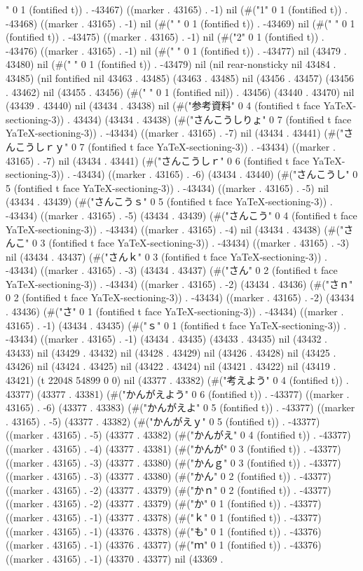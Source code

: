 " 0 1 (fontified t)) . -43467) ((marker . 43165) . -1) nil (#("1" 0 1 (fontified t)) . -43468) ((marker . 43165) . -1) nil (#("
" 0 1 (fontified t)) . -43469) nil (#("
" 0 1 (fontified t)) . -43475) ((marker . 43165) . -1) nil (#("2" 0 1 (fontified t)) . -43476) ((marker . 43165) . -1) nil (#("
" 0 1 (fontified t)) . -43477) nil (43479 . 43480) nil (#("
" 0 1 (fontified t)) . -43479) nil (nil rear-nonsticky nil 43484 . 43485) (nil fontified nil 43463 . 43485) (43463 . 43485) nil (43456 . 43457) (43456 . 43462) nil (43455 . 43456) (#(" " 0 1 (fontified nil)) . 43456) (43440 . 43470) nil (43439 . 43440) nil (43434 . 43438) nil (#("参考資料" 0 4 (fontified t face YaTeX-sectioning-3)) . 43434) (43434 . 43438) (#("さんこうしりょ" 0 7 (fontified t face YaTeX-sectioning-3)) . -43434) ((marker . 43165) . -7) nil (43434 . 43441) (#("さんこうしｒｙ" 0 7 (fontified t face YaTeX-sectioning-3)) . -43434) ((marker . 43165) . -7) nil (43434 . 43441) (#("さんこうしｒ" 0 6 (fontified t face YaTeX-sectioning-3)) . -43434) ((marker . 43165) . -6) (43434 . 43440) (#("さんこうし" 0 5 (fontified t face YaTeX-sectioning-3)) . -43434) ((marker . 43165) . -5) nil (43434 . 43439) (#("さんこうｓ" 0 5 (fontified t face YaTeX-sectioning-3)) . -43434) ((marker . 43165) . -5) (43434 . 43439) (#("さんこう" 0 4 (fontified t face YaTeX-sectioning-3)) . -43434) ((marker . 43165) . -4) nil (43434 . 43438) (#("さんこ" 0 3 (fontified t face YaTeX-sectioning-3)) . -43434) ((marker . 43165) . -3) nil (43434 . 43437) (#("さんｋ" 0 3 (fontified t face YaTeX-sectioning-3)) . -43434) ((marker . 43165) . -3) (43434 . 43437) (#("さん" 0 2 (fontified t face YaTeX-sectioning-3)) . -43434) ((marker . 43165) . -2) (43434 . 43436) (#("さｎ" 0 2 (fontified t face YaTeX-sectioning-3)) . -43434) ((marker . 43165) . -2) (43434 . 43436) (#("さ" 0 1 (fontified t face YaTeX-sectioning-3)) . -43434) ((marker . 43165) . -1) (43434 . 43435) (#("ｓ" 0 1 (fontified t face YaTeX-sectioning-3)) . -43434) ((marker . 43165) . -1) (43434 . 43435) (43433 . 43435) nil (43432 . 43433) nil (43429 . 43432) nil (43428 . 43429) nil (43426 . 43428) nil (43425 . 43426) nil (43424 . 43425) nil (43422 . 43424) nil (43421 . 43422) nil (43419 . 43421) (t 22048 54899 0 0) nil (43377 . 43382) (#("考えよう" 0 4 (fontified t)) . 43377) (43377 . 43381) (#("かんがえよう" 0 6 (fontified t)) . -43377) ((marker . 43165) . -6) (43377 . 43383) (#("かんがえよ" 0 5 (fontified t)) . -43377) ((marker . 43165) . -5) (43377 . 43382) (#("かんがえｙ" 0 5 (fontified t)) . -43377) ((marker . 43165) . -5) (43377 . 43382) (#("かんがえ" 0 4 (fontified t)) . -43377) ((marker . 43165) . -4) (43377 . 43381) (#("かんが" 0 3 (fontified t)) . -43377) ((marker . 43165) . -3) (43377 . 43380) (#("かんｇ" 0 3 (fontified t)) . -43377) ((marker . 43165) . -3) (43377 . 43380) (#("かん" 0 2 (fontified t)) . -43377) ((marker . 43165) . -2) (43377 . 43379) (#("かｎ" 0 2 (fontified t)) . -43377) ((marker . 43165) . -2) (43377 . 43379) (#("か" 0 1 (fontified t)) . -43377) ((marker . 43165) . -1) (43377 . 43378) (#("ｋ" 0 1 (fontified t)) . -43377) ((marker . 43165) . -1) (43376 . 43378) (#("も" 0 1 (fontified t)) . -43376) ((marker . 43165) . -1) (43376 . 43377) (#("ｍ" 0 1 (fontified t)) . -43376) ((marker . 43165) . -1) (43370 . 43377) nil (43369 . 